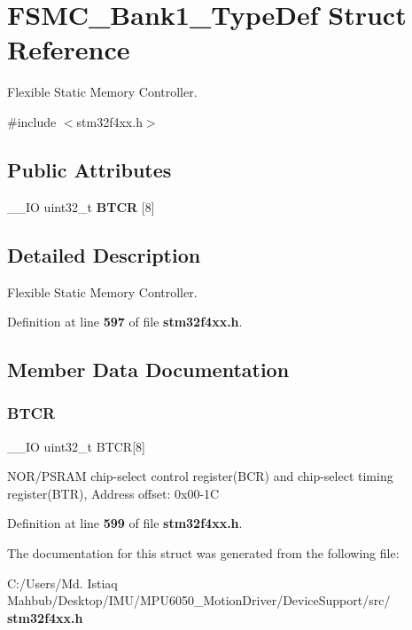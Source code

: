 \section{F\+S\+M\+C\+\_\+\+Bank1\+\_\+\+Type\+Def Struct Reference}
\label{structFSMC__Bank1__TypeDef}


Flexible Static Memory Controller.  




{\ttfamily \#include $<$stm32f4xx.\+h$>$}

\subsection*{Public Attributes}
\begin{DoxyCompactItemize}
\item 
\+\_\+\+\_\+\+IO uint32\+\_\+t \textbf{ B\+T\+CR} [8]
\end{DoxyCompactItemize}


\subsection{Detailed Description}
Flexible Static Memory Controller. 

Definition at line \textbf{ 597} of file \textbf{ stm32f4xx.\+h}.



\subsection{Member Data Documentation}
\mbox{\label{structFSMC__Bank1__TypeDef_a80a6708b507f6eecbc10424fdb088b79}} 
\subsubsection{B\+T\+CR}
{\footnotesize\ttfamily \+\_\+\+\_\+\+IO uint32\+\_\+t B\+T\+CR[8]}

N\+O\+R/\+P\+S\+R\+AM chip-\/select control register(\+B\+C\+R) and chip-\/select timing register(\+B\+T\+R), Address offset\+: 0x00-\/1C 

Definition at line \textbf{ 599} of file \textbf{ stm32f4xx.\+h}.



The documentation for this struct was generated from the following file\+:\begin{DoxyCompactItemize}
\item 
C\+:/\+Users/\+Md. Istiaq Mahbub/\+Desktop/\+I\+M\+U/\+M\+P\+U6050\+\_\+\+Motion\+Driver/\+Device\+Support/src/\textbf{ stm32f4xx.\+h}\end{DoxyCompactItemize}

